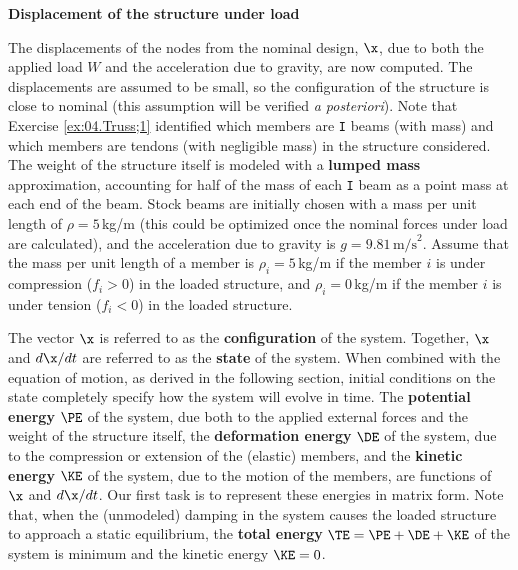 \begin{exercise} \label{ex:04.Truss;2} \rm {\bf Displacement of the structure under load}\vskip0.05in

\noindent The displacements of the nodes from the nominal design, $\x$, due to
both the applied load $W$ and the acceleration due to gravity, are now
computed.  The displacements are assumed to be small, so the
configuration of the structure is close to nominal (this assumption
will be verified {\it a posteriori}).  Note that Exercise \ref{ex:04.Truss;1} identified
which members are {\tt I} beams (with mass) and which members are tendons (with
negligible mass) in the structure considered.
The weight of the structure itself is modeled with a {\bf lumped mass}
approximation, accounting for half of the mass of each {\tt I} beam as a point
mass at each end of the beam.  Stock beams are initially chosen with a
mass per unit length of $\rho = 5\,$kg/m (this could be optimized once the nominal forces under load are calculated),
and the acceleration due to gravity is $g = 9.81\,\textrm{m/s}^2$.  Assume that the mass per unit length of a
member is $\rho_i = 5\,$kg/m if the member $i$ is under compression ($f_i>0$)
in the loaded structure, and $\rho_i = 0\,$kg/m if the member $i$ is under
tension ($f_i < 0$) in the loaded structure.

The vector $\x$ is referred to as the {\bf configuration} of the
system.  Together, $\x$ and $d\x/dt$ are referred to as the {\bf
state} of the system.  When combined with the equation of motion, as derived in the following section,
initial conditions on the state completely specify how the system will
evolve in time.  The {\bf potential energy} $\PE$ of the system, due
both to the applied external forces and the weight of the structure
itself, the {\bf deformation energy} $\DE$ of the system, due to the
compression or extension of the (elastic) members, and the {\bf
kinetic energy} $\KE$ of the system, due to the motion of the members,
are functions of $\x$ and $d\x/dt$.  Our first task is to
represent these energies in matrix form.  Note that, when the
(unmodeled) damping in the system causes the loaded structure to
approach a static equilibrium, the {\bf total energy}
$\TE=\PE+\DE+\KE$ of the system is minimum and the kinetic energy
$\KE=0$.


\end{exercise}
